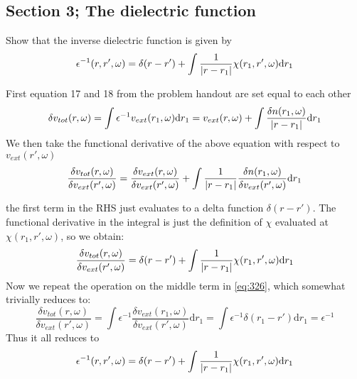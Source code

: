 \subsection{Section 3; The dielectric function}
\begin{exercise}
Show that the inverse dielectric function is given by
\begin{equation}
    \epsilon^{-1}(r,r',\omega) = \delta(r-r') + \int \dfrac{1}{\abs{r-r_1}}\chi(r_1,r',\omega)\mathrm{d}r_1
\end{equation}
\end{exercise}
\begin{solution}
First equation 17 and 18 from the problem handout are set equal to each other 
\begin{equation}
    \delta v_{tot}(r,\omega) = \int \epsilon^{-1} v_{ext}(r_1,\omega) \mathrm{d} r_1 = v_{ext}(r,\omega) + \int \frac{\delta n(r_1,\omega)}{\abs{r-r_1}} \mathrm{d}r_1\label{eq:326}
\end{equation}
We then take the functional derivative of the above equation with respect to $v_{ext}(r',\omega)$
\begin{equation}
    \dfrac{\delta v_{tot}(r,\omega)}{\delta v_{ext}(r',\omega)} = \dfrac{\delta v_{ext}(r,\omega)}{\delta v_{ext}(r',\omega)} + \int \dfrac{1}{\abs{r-r_1}}\dfrac{\delta n(r_1,\omega)}{\delta v_{ext}(r',\omega)}\mathrm{d}r_1
\end{equation}

the first term in the RHS just evaluates to a delta function $\delta(r-r')$. The functional derivative in the integral is just the definition of $\chi$ evaluated at $\chi(r_1,r',\omega)$, so we obtain:
\begin{equation}
    \dfrac{\delta v_{tot}(r,\omega)}{\delta v_{ext}(r',\omega)} = \delta(r-r') + \int \dfrac{1}{\abs{r-r_1}}\chi(r_1,r',\omega)\mathrm{d}r_1 \label{eq:327}
\end{equation}
Now we repeat the operation on the middle term in \eqref{eq:326}, which somewhat trivially reduces to:
\begin{equation}
    \dfrac{\delta v_{tot}(r,\omega)}{\delta v_{ext}(r',\omega)} = \int \epsilon^{-1}\dfrac{\delta v_{ext}(r_1,\omega)}{\delta v_{ext}(r',\omega)} \mathrm{d}r_1 = \int \epsilon^{-1} \delta(r_1 - r') \mathrm{d}r_1 = \epsilon^{-1} \label{eq:328}
\end{equation}
Thus it all reduces to
\begin{equation}
    \epsilon^{-1}(r,r',\omega) = \delta(r-r') + \int \dfrac{1}{\abs{r-r_1}}\chi(r_1,r',\omega) \mathrm{d}r_1
\end{equation}
\end{solution}

